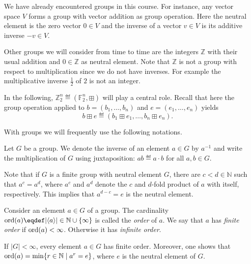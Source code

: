\documentclass[a4paper, oneside, 12pt]{amsart}
\begin{document}
We have already encountered groups in this course.
For instance, any vector space \( V \) forms a group with vector addition as group operation.
Here the neutral element is the zero vector \(0 \in V\) and the inverse of a vector \( v \in V \) is its additive inverse \( -v\in V \).

\begin{example}\label{ex:z2-and-z-as-groups}
  Other groups we will consider from time to time are the integers \(\mathbb{Z}\) with their usual addition and \(0 \in \mathbb{Z}\) as neutral element.
  Note that \(\mathbb{Z}\) is not a group with respect to multiplication since we do not have inverses.
  For example the multiplicative inverse \(\tfrac{1}{2}\) of \(2\) is not an integer.

  In the following, \( \mathbb{Z}_{2}^{n} \eqdef (\mathbb{F}_{2}^{n}, \boxplus)\) will play a central role.
  Recall that here the group operation applied to \(b= (b_{1}, \dots , b_{n})\) and \(e= (e_{1}, \dots , e_{n})\) yields
  \begin{equation*}
    b \boxplus e \eqdef (b_{1}\boxplus e_{1}, \dots , b_{n} \boxplus e_{n}).
  \end{equation*}

\end{example}

With groups we will frequently use the following notations.
\begin{convention}
  Let \(G\) be a group.
  We denote the inverse of an element \(a\in G\) by \(a^{-1}\) and write the multiplication of \(G\) using juxtaposition: \( ab \eqdef a \cdot b\) for all \(a,b \in G\).
\end{convention}

Note that if \(G\) is a finite group with neutral element \(G\), there  are \(c<d \in \mathbb{N}\)  such that \(a^{c}= a^{d}\), where \(a^{c}\) and \(a^{d}\) denote the \(c\) and \(d\)-fold product of \(a\) with itself, respectively.
This implies that \(a^{d-c}=e\) is the neutral element.

\begin{definition}\label{def:order}
  Consider an element \(a\in G\) of a group.
  The cardinality \(\ord(a) \eqdef |\langle a \rangle | \in \mathbb{N} \cup \{\infty\}\) is called the \emph{order}
  of \(a\).
  We say that \(a\) has \emph{finite order} if \(\operatorname{ord}(a)< \infty\).
  Otherwise it has \emph{infinite order}.
\end{definition}

\begin{remark}\label{rmk:finite-group-means-finite-order}
  If \(|G|< \infty\), every element \(a\in G\) has finite order.
  Moreover, one shows that \(\operatorname{ord}(a) = \min\{r \in \mathbb{N} \mid a^{r} =e\}\), where \(e\) is the neutral element of \(G\).
\end{remark}
\end{document}
